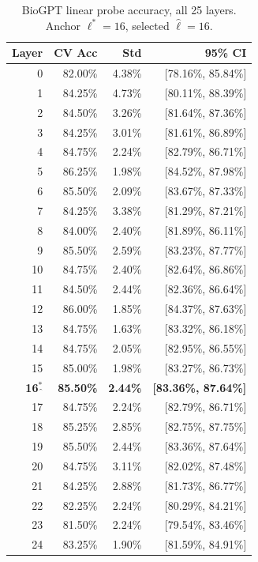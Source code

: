 \documentclass[11pt,a4paper]{article}
\begin{document}
\begin{table}[ht]
\centering
\caption{BioGPT linear probe accuracy, all 25 layers. Anchor $\ell^*=16$,
  selected $\hat{\ell}=16$.}
\label{tab:probe_biogpt}
\small
\begin{tabular}{rrrr}
\toprule
Layer & CV Acc & Std & 95\% CI \\
\midrule
0  & 82.00\% & 4.38\% & [78.16\%, 85.84\%] \\
1  & 84.25\% & 4.73\% & [80.11\%, 88.39\%] \\
2  & 84.50\% & 3.26\% & [81.64\%, 87.36\%] \\
3  & 84.25\% & 3.01\% & [81.61\%, 86.89\%] \\
4  & 84.75\% & 2.24\% & [82.79\%, 86.71\%] \\
5  & 86.25\% & 1.98\% & [84.52\%, 87.98\%] \\
6  & 85.50\% & 2.09\% & [83.67\%, 87.33\%] \\
7  & 84.25\% & 3.38\% & [81.29\%, 87.21\%] \\
8  & 84.00\% & 2.40\% & [81.89\%, 86.11\%] \\
9  & 85.50\% & 2.59\% & [83.23\%, 87.77\%] \\
10 & 84.75\% & 2.40\% & [82.64\%, 86.86\%] \\
11 & 84.50\% & 2.44\% & [82.36\%, 86.64\%] \\
12 & 86.00\% & 1.85\% & [84.37\%, 87.63\%] \\
13 & 84.75\% & 1.63\% & [83.32\%, 86.18\%] \\
14 & 84.75\% & 2.05\% & [82.95\%, 86.55\%] \\
15 & 85.00\% & 1.98\% & [83.27\%, 86.73\%] \\
\textbf{16$^*\hat{}$} & \textbf{85.50\%} & \textbf{2.44\%} & \textbf{[83.36\%, 87.64\%]} \\
17 & 84.75\% & 2.24\% & [82.79\%, 86.71\%] \\
18 & 85.25\% & 2.85\% & [82.75\%, 87.75\%] \\
19 & 85.50\% & 2.44\% & [83.36\%, 87.64\%] \\
20 & 84.75\% & 3.11\% & [82.02\%, 87.48\%] \\
21 & 84.25\% & 2.88\% & [81.73\%, 86.77\%] \\
22 & 82.25\% & 2.24\% & [80.29\%, 84.21\%] \\
23 & 81.50\% & 2.24\% & [79.54\%, 83.46\%] \\
24 & 83.25\% & 1.90\% & [81.59\%, 84.91\%] \\
\bottomrule
\end{tabular}
\end{table}
\end{document}
